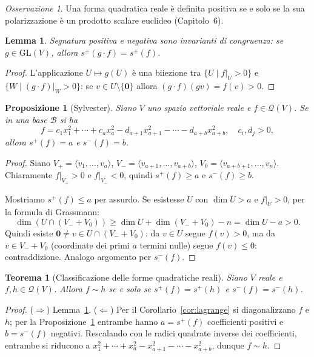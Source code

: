 \documentclass[11pt, a4paper]{book}
\theoremstyle{definition}
\theoremstyle{plain}
\newtheorem{teorema}[definizione]{Teorema}
\newtheorem{proposizione}[definizione]{Proposizione}
\newtheorem{lemma}[definizione]{Lemma}
\theoremstyle{remark}
\newtheorem{osservazione}[definizione]{Osservazione}
\newcommand{\GL}{\mathrm{GL}}
\begin{document}
\begin{osservazione}
Una forma quadratica reale è definita positiva se e solo se la sua polarizzazione è un prodotto scalare euclideo (Capitolo~6).
\end{osservazione}

\begin{lemma}
\label{lem:segnatura-invariante}
Segnatura positiva e negativa sono invarianti di congruenza: se $g \in \GL(V)$, allora $s^\pm(g\cdot f) = s^\pm(f)$.
\end{lemma}

\begin{proof}
L'applicazione $U \mapsto g(U)$ è una biiezione tra $\{U \mid f|_U > 0\}$ e $\{W \mid (g\cdot f)|_W > 0\}$: se $v \in U\setminus\{\mathbf{0}\}$ allora $(g\cdot f)(gv) = f(v) > 0$.
\end{proof}

\begin{proposizione}[Sylvester]
\label{prop:sylvester}
Siano $V$ uno spazio vettoriale reale e $f \in \mathcal{Q}(V)$. Se in una base $\mathcal{B}$ si ha
\[
  f = c_1x_1^2+\cdots+c_ax_a^2 - d_{a+1}x_{a+1}^2-\cdots-d_{a+b}x_{a+b}^2, \quad c_i,d_j > 0,
\]
allora $s^+(f) = a$ e $s^-(f) = b$.
\end{proposizione}

\begin{proof}
Siano $V_+ = \langle v_1,\ldots,v_a\rangle$, $V_- = \langle v_{a+1},\ldots,v_{a+b}\rangle$, $V_0 = \langle v_{a+b+1},\ldots,v_n\rangle$. Chiaramente $f|_{V_+} > 0$ e $f|_{V_-} < 0$, quindi $s^+(f) \geq a$ e $s^-(f) \geq b$.

Mostriamo $s^+(f) \leq a$ per assurdo. Se esistesse $U$ con $\dim U > a$ e $f|_U > 0$, per la formula di Grassmann:
\[
  \dim(U \cap (V_-+V_0)) \geq \dim U + \dim(V_-+V_0) - n = \dim U - a > 0.
\]
Quindi esiste $\mathbf{0} \neq v \in U \cap (V_-+V_0)$: da $v \in U$ segue $f(v) > 0$, ma da $v \in V_-+V_0$ (coordinate dei primi $a$ termini nulle) segue $f(v) \leq 0$: contraddizione. Analogo argomento per $s^-(f)$.
\end{proof}

\begin{teorema}[Classificazione delle forme quadratiche reali]
\label{thm:class-reali}
Siano $V$ reale e $f, h \in \mathcal{Q}(V)$. Allora $f \sim h$ se e solo se $s^+(f) = s^+(h)$ e $s^-(f) = s^-(h)$.
\end{teorema}

\begin{proof}
($\Rightarrow$) Lemma~\ref{lem:segnatura-invariante}. ($\Leftarrow$) Per il Corollario~\ref{cor:lagrange} si diagonalizzano $f$ e $h$; per la Proposizione~\ref{prop:sylvester} entrambe hanno $a = s^+(f)$ coefficienti positivi e $b = s^-(f)$ negativi. Rescalando con le radici quadrate inverse dei coefficienti, entrambe si riducono a $x_1^2+\cdots+x_a^2-x_{a+1}^2-\cdots-x_{a+b}^2$, dunque $f \sim h$.
\end{proof}
\end{document}
